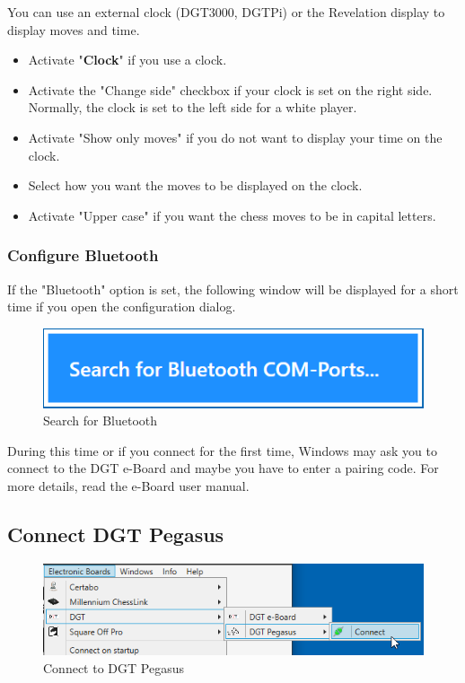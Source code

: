 \documentclass[11pt,a4paper]{article}
\begin{document}
You can use an external clock (DGT3000, DGTPi) or the Revelation display to display moves and time.
\begin{itemize}
	\item Activate "\textbf{Clock}" if you use a clock.
	\item Activate the "Change side" checkbox if your clock is set on the right side. Normally, the clock is set to the left side for a white player. 
	\item Activate "Show only moves" if you do not want to display your time on the clock.
	\item Select how you want the moves to be displayed on the clock.
    \item Activate "Upper case" if you want the chess moves  to be in capital letters.
\end{itemize}


\subsubsection{Configure Bluetooth} \label{BluetoothDGT}

If the "Bluetooth" option is set, the following window will be displayed for a short time if you open the configuration dialog.

\begin{figure}[H]
	\centering
	\includegraphics[scale=0.8]{MillenniumChessLink10.png}
	\caption{Search for Bluetooth}
	\label{fig:DGTEBoardBT}
\end{figure}

During this time or if you connect for the first time, Windows may ask you to connect to the DGT e-Board and maybe you have to enter a pairing code. For more details, read the e-Board user manual.\\


\subsection{Connect DGT Pegasus} \label{ConfigurePegasus}
\begin{figure}[H]
	\centering
	\includegraphics[scale=0.8]{Pegasus1.png}
	\caption{Connect to DGT Pegasus}
	\label{fig:Pegasus1}
\end{figure}
\end{document}
